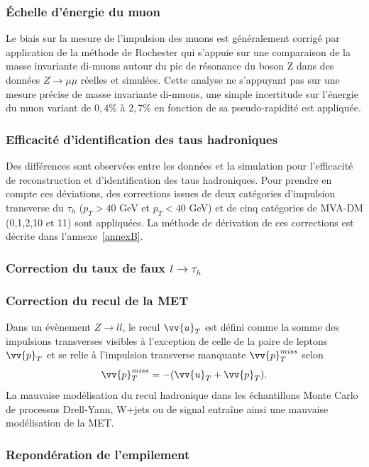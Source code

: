 \subsubsection{ Échelle d'énergie du muon}

Le biais sur la mesure de l'impulsion des muons est généralement corrigé par application de la méthode de Rochester qui s'appuie sur une comparaison de la masse invariante di-muons autour du pic de résonance du boson Z dans des données $Z\rightarrow\mu\mu$ réelles et simulées. Cette analyse ne s'appuyant pas sur une mesure précise de masse invariante di-muons, une simple incertitude sur l'énergie du muon variant de $0,4\%$ à $2,7\%$ en fonction de sa pseudo-rapidité est appliquée.

\subsubsection{ Efficacité d'identification des taus hadroniques}

Des différences sont observées entre les données et la simulation pour l'efficacité de reconstruction et d'identification des taus hadroniques. Pour prendre en compte ces déviations, des corrections issues de deux catégories d'impulsion transverse du $\tau_h$ ($p_{T}>40$ GeV et $p_T<40$ GeV) et de cinq catégories de MVA-DM (0,1,2,10 et 11) sont appliquées. La méthode de dérivation de ces corrections est décrite dans l'annexe~\ref{annexB}.

\subsubsection{ Correction du taux de faux $l\rightarrow\tau_h$}

\subsubsection{ Correction du recul de la MET}

Dans un évènement $Z\rightarrow ll$, le recul $\vv{u}_T$ est défini comme la somme des impulsions transverses visibles à l'exception de celle de la paire de leptons $\vv{p}_T$ et se relie à l'impulsion transverse manquante $\vv{p}^{miss}_T$ selon $$\vv{p}^{miss}_T=-(\vv{u}_T+\vv{p}_T).$$ La mauvaise modélisation du recul hadronique dans les échantillons Monte Carlo de processus Drell-Yann, W+jets ou de signal entraîne ainsi une mauvaise modélisation de la MET.

\subsubsection{ Repondération de l'empilement}

